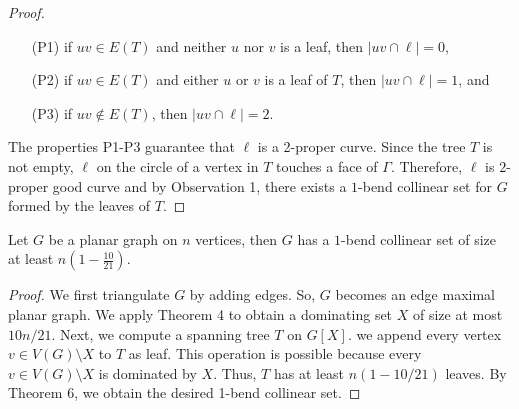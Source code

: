 \begin{proof}
    \begin{enumerate}
        \item [(P1)] if $uv \in E(T)$ and neither $u$ nor $v$ is a leaf, then $|uv \cap \ell| = 0$,

        \item [(P2)] if $uv \in E(T)$ and either $u$ or $v$ is a leaf of $T$, then $|uv \cap \ell| = 1$, and

        \item [(P3)] if $uv \notin E(T)$, then $|uv \cap \ell| = 2$.
    \end{enumerate}

    The properties P1-P3 guarantee that $\ell$ is a 2-proper curve. Since the tree $T$ is not empty, $\ell$ on the circle of a vertex in $T$ touches a face of $\Gamma$. Therefore, $\ell$ is $2$-proper good curve and by Observation 1, there exists a $1$-bend collinear set for $G$ formed by the leaves of $T$.


\end{proof}


\begin{thm}
    Let $G$ be a planar graph on $n$ vertices, then $G$ has a $1$-bend collinear set of size at least $n(1 - \frac{10}{21})$.
\end{thm}

\begin{proof}
We first triangulate $G$ by adding edges. So, $G$ becomes an edge maximal planar graph. We apply Theorem 4 to obtain a dominating set $X$ of size at most $10n/21$. Next, we compute a spanning tree $T$ on $G[X]$. we append every vertex $v \in V(G)\setminus X$ to $T$ as leaf. This operation is possible because every $v \in V(G) \setminus X$ is dominated by $X$. Thus, $T$ has at least $n(1 - 10/21)$ leaves. By Theorem 6, we obtain the desired 1-bend collinear set.
\end{proof}